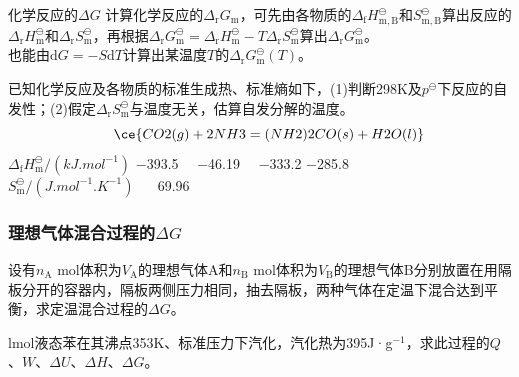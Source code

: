 \begin{frame}{化学反应的$\Delta G$}
    计算化学反应的$\Delta_\mathrm{r} G_\mathrm{m}$，可先由各物质的$\Delta_\mathrm{f} H_\mathrm{m,B}^\ominus$和$S_\mathrm{m,B}^\ominus$算出反应的$\Delta_\mathrm{r} H_\mathrm{m}^\ominus$和$\Delta_\mathrm{r} S_\mathrm{m}^\ominus$，再根据$\Delta_\mathrm{r} G_\mathrm{m}^\ominus=\Delta_\mathrm{r} H_\mathrm{m}^\ominus-T\Delta_\mathrm{r} S_\mathrm{m}^\ominus$算出$\Delta_\mathrm{r} G_\mathrm{m}^\ominus$。
    \\也能由$\mathrm{d}G=-S\mathrm{d}T$计算出某温度$T$的$\Delta_\mathrm{r} G_\mathrm{m}^\ominus(T)$。
    \begin{example}
        已知化学反应及各物质的标准生成热、标准熵如下，(1)判断298K及$p^\ominus$下反应的自发性；(2)假定$\Delta_\mathrm{r} S_\mathrm{m}^\ominus$与温度无关，估算自发分解的温度。
        $$~~~~\ce{CO2(g) + 2NH3 = (NH2)2CO(s) + H2O(l)}$$
        $\Delta_\mathrm{f} H_\mathrm{m}^\ominus /(\si{kJ.mol^{-1}})$ \quad \num{-393.5} ~~\num{-46.19}\qquad~~ \num{-333.2} \qquad \num{-285.8}
        \\$S_\mathrm{m}^\ominus /(\si{J.mol^{-1}.K^{-1}})$  \qquad{} \qquad~~ 69.96
    \end{example}
\end{frame} 


\begin{frame}[t]
    \frametitle{理想气体混合过程的$\Delta G$}
    \begin{example}
        设有$n_\mathrm{A}$ mol体积为$V_\mathrm{A}$的理想气体A和$n_\mathrm{B}$ mol体积为$V_\mathrm{B}$的理想气体B分别放置在用隔板分开的容器内，隔板两侧压力相同，抽去隔板，两种气体在定温下混合达到平衡，求定温混合过程的$\Delta G$。
    \end{example}
\end{frame}


\begin{frame}[t]{}
    \begin{example}
        lmol液态苯在其沸点353K、标准压力下汽化，汽化热为395J·g$^{-1}$，求此过程的$Q$、$W$、$\Delta U$、$\Delta H$、$\Delta G$。
    \end{example}
\end{frame}


